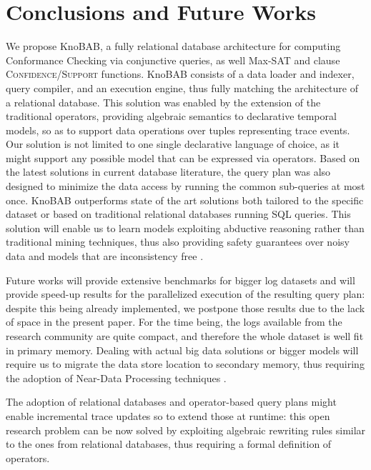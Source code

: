 \vspace{-4mm}\section{Conclusions and Future Works}
We propose KnoBAB, a fully relational database architecture for computing Conformance Checking via conjunctive queries, as well Max-SAT and clause \textsc{Confidence}/\textsc{Support} functions.  KnoBAB consists of a data loader and indexer, query compiler, and an execution engine, thus fully matching the architecture of a relational database. This solution was enabled by the extension of the traditional \LTLf operators, providing algebraic semantics to declarative temporal models, so as to support data operations over tuples representing trace  events. Our solution is not limited to one single declarative language of choice, as it might support any possible model that can be expressed via \xLTLf operators. Based on the latest solutions in current database literature, the query plan was also designed to minimize the data access by running the common sub-queries at most once.
%
KnoBAB outperforms state of the art solutions both tailored to the specific dataset or based on traditional relational databases running SQL queries.  This solution will enable us to learn models exploiting abductive reasoning rather than traditional mining techniques, thus also providing safety guarantees over noisy data and models that are inconsistency free \cite{PicadoDTL20}. 

Future works will provide extensive benchmarks for bigger log datasets and will provide speed-up results for the parallelized execution of the resulting query plan: despite this being already implemented, we postpone those results due to the lack of space in the present paper. For the time being, the logs available from the research community are quite compact, and therefore the whole dataset is well fit in primary memory. Dealing with actual big data solutions or bigger models will require us to migrate the data store location to secondary memory, thus requiring the adoption of Near-Data Processing techniques \cite{GuYBJLYKKYCJC16}.  

The adoption of relational databases and operator-based query plans might enable incremental trace updates so to extend those at runtime: this open research problem  can be now  solved by exploiting algebraic rewriting rules similar to the ones from relational databases, thus requiring a formal definition of \xLTLf operators. 


